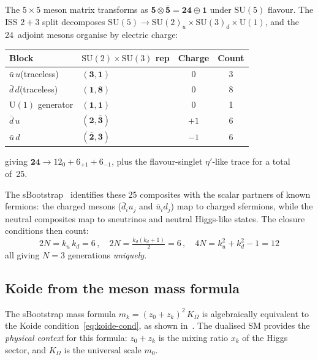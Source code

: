 \documentclass[11pt,a4paper]{article}
\newcommand{\SU}[1]{\mathrm{SU}(#1)}
\newcommand{\UU}[1]{\mathrm{U}(#1)}
\theoremstyle{definition}\newtheorem{exercise}{Exercise}[section]
\begin{document}
The $5\times 5$ meson matrix transforms as
$\mathbf{5}\otimes\overline{\mathbf{5}} = \mathbf{24}\oplus\mathbf{1}$
under $\SU{5}$ flavour.  The ISS $2+3$ split decomposes
$\SU{5} \to \SU{2}_u \times \SU{3}_d \times \UU{1}$, and
the 24~adjoint mesons organise by electric charge:
\begin{center}\small
\begin{tabular}{@{}llcc@{}}
\toprule
Block & $\SU{2}\times\SU{3}$ rep & Charge & Count \\
\midrule
$\bar u\,u$\;(traceless) & $(\mathbf{3},\mathbf{1})$ & $0$ & 3 \\
$\bar d\,d$\;(traceless) & $(\mathbf{1},\mathbf{8})$ & $0$ & 8 \\
$\UU{1}$ generator & $(\mathbf{1},\mathbf{1})$ & $0$ & 1 \\
$\bar d\,u$ & $(\mathbf{2},\overline{\mathbf{3}})$ & $+1$ & 6 \\
$\bar u\,d$ & $(\overline{\mathbf{2}},\mathbf{3})$ & $-1$ & 6 \\
\bottomrule
\end{tabular}
\end{center}
giving $\mathbf{24} \to 12_0 + 6_{+1} + 6_{-1}$, plus the
flavour-singlet $\eta'$-like trace for a total of~25.

The sBootstrap~\cite{Rivero2009,Rivero2024} identifies these 25
composites with the scalar partners of known fermions: the charged
mesons ($\bar d_i u_j$ and $\bar u_i d_j$) map to charged
sfermions, while the neutral composites map to sneutrinos and
neutral Higgs-like states.  The closure conditions then
count:
\begin{equation}
  2N = k_u\,k_d = 6\,,\quad
  2N = \tfrac{k_d(k_d+1)}{2} = 6\,,\quad
  4N = k_u^2+k_d^2-1 = 12
\end{equation}
all giving $N = 3$ generations \emph{uniquely}.

\subsection{Koide from the meson mass formula}

The sBootstrap mass formula $m_k = (z_0+z_k)^2\,K_\Omega$
is algebraically equivalent to the Koide condition~\eqref{eq:koide-cond},
as shown in~\cite{Rivero2024}.  The dualised SM provides the
\emph{physical context} for this formula: $z_0+z_k$ is the
mixing ratio $x_k$ of the Higgs sector, and $K_\Omega$ is
the universal scale $m_0$.

\end{document}
